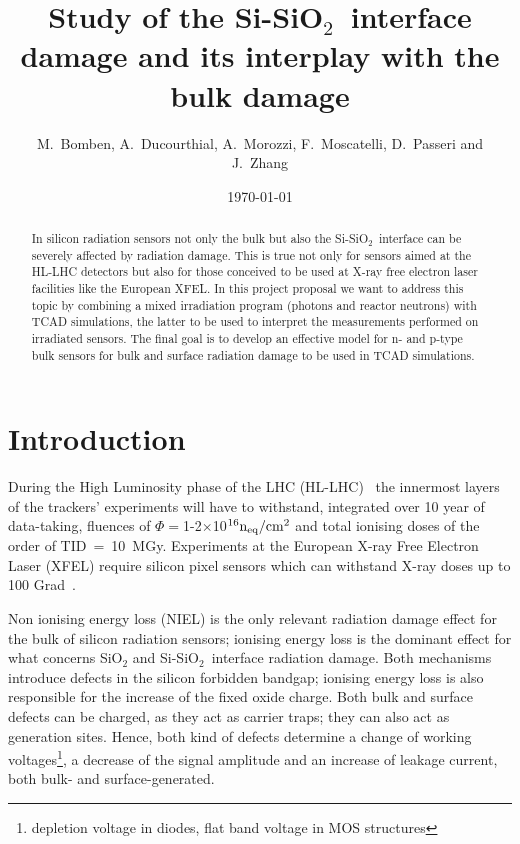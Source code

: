 \documentclass[dvips,12pt]{article}
\begin{document}
\title{Study of the Si-SiO$_2$~interface damage and its interplay with the bulk damage}
\author{M.~Bomben, A.~Ducourthial, A.~Morozzi,  F.~Moscatelli, D.~Passeri and J.~Zhang}
\date{\today}



\maketitle

\begin{abstract}
In silicon radiation sensors not only the bulk but also the Si-SiO$_2$~interface can be severely 
affected by radiation damage. This is true not only for sensors aimed at the HL-LHC detectors 
but also for those conceived to be used at X-ray free electron laser facilities like the European XFEL. 
In this project proposal we want to address this topic by combining a mixed irradiation program 
(photons and reactor neutrons) with TCAD simulations, the latter to be used to interpret the 
measurements performed on irradiated sensors. The final goal is to develop an effective model 
for n- and p-type bulk sensors for bulk and surface radiation damage to be used in TCAD 
simulations.

\end{abstract}


\section{Introduction}

During the High Luminosity phase of the LHC (HL-LHC)~\cite{HL-LHC} the innermost layers of 
 the trackers' experiments will have to 
withstand, integrated over 10 year of data-taking,
  fluences of $\Phi = $1-2$\times$10$^{16}{\rm n_{eq}/cm^2}$  and total ionising doses of the order 
  of  
 TID~=~10~MGy. Experiments at the European X-ray Free Electron Laser (XFEL) require silicon 
 pixel sensors which can withstand X-ray doses up to 100 Grad~\cite{zhang-thesis}.
 
 Non ionising energy loss (NIEL) is the only relevant radiation damage effect for the 
 bulk of silicon radiation sensors; ionising energy loss is the dominant effect for what concerns 
 SiO$_2$ and Si-SiO$_2$~interface radiation damage.
 Both mechanisms introduce defects in the silicon forbidden bandgap; ionising energy loss is 
 also responsible for the increase of the fixed oxide charge. Both bulk and surface defects 
 can be charged, as they act as carrier traps; they can also act as generation sites. Hence, 
 both kind of defects determine a change of working 
 voltages\footnote{depletion voltage in diodes, flat band voltage in MOS structures}, a decrease 
 of the signal amplitude and an increase of leakage current, both bulk- and surface-generated.
\end{document}
